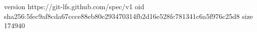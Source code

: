 version https://git-lfs.github.com/spec/v1
oid sha256:5fec9af8cda67ccce88eb80e293470314fb2d16e528fc781341c6a5f976c25d8
size 174940
